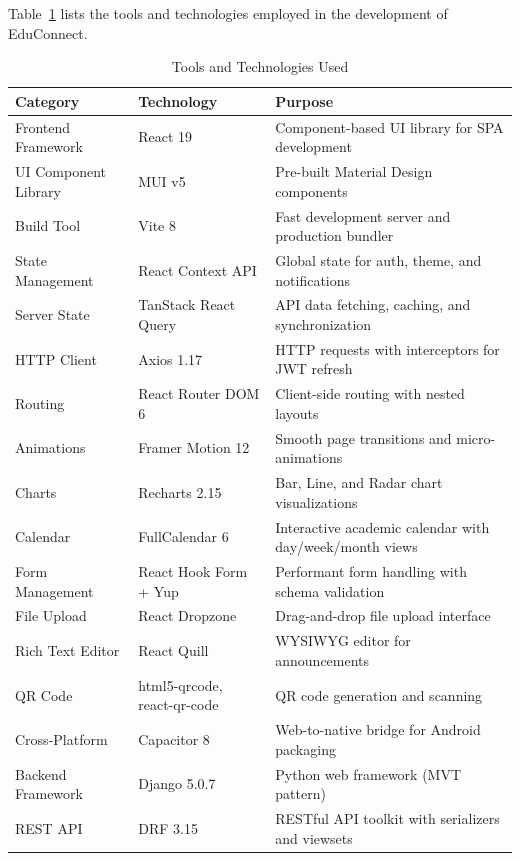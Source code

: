 Table~\ref{tab:tools} lists the tools and technologies employed in the development of EduConnect.

\begin{table}[H]
\centering
\caption{Tools and Technologies Used}
\label{tab:tools}
\footnotesize
\begin{tabular}{|p{3.5cm}|p{3cm}|p{7cm}|}
\hline
\textbf{Category} & \textbf{Technology} & \textbf{Purpose} \\
\hline
Frontend Framework & React 19 & Component-based UI library for SPA development \\
\hline
UI Component Library & MUI v5 & Pre-built Material Design components \\
\hline
Build Tool & Vite 8 & Fast development server and production bundler \\
\hline
State Management & React Context API & Global state for auth, theme, and notifications \\
\hline
Server State & TanStack React Query & API data fetching, caching, and synchronization \\
\hline
HTTP Client & Axios 1.17 & HTTP requests with interceptors for JWT refresh \\
\hline
Routing & React Router DOM 6 & Client-side routing with nested layouts \\
\hline
Animations & Framer Motion 12 & Smooth page transitions and micro-animations \\
\hline
Charts & Recharts 2.15 & Bar, Line, and Radar chart visualizations \\
\hline
Calendar & FullCalendar 6 & Interactive academic calendar with day/week/month views \\
\hline
Form Management & React Hook Form + Yup & Performant form handling with schema validation \\
\hline
File Upload & React Dropzone & Drag-and-drop file upload interface \\
\hline
Rich Text Editor & React Quill & WYSIWYG editor for announcements \\
\hline
QR Code & html5-qrcode, react-qr-code & QR code generation and scanning \\
\hline
Cross-Platform & Capacitor 8 & Web-to-native bridge for Android packaging \\
\hline
Backend Framework & Django 5.0.7 & Python web framework (MVT pattern) \\
\hline
REST API & DRF 3.15 & RESTful API toolkit with serializers and viewsets \\
\hline

\end{tabular}
\end{table}
